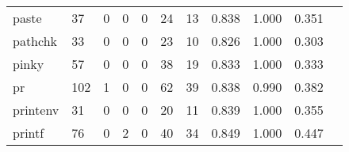 \begin{longtable}{lp{1.20cm}p{1.20cm}p{1.20cm}p{1.20cm}p{1.20cm}p{1.20cm}p{1.20cm}p{1.20cm}p{1.20cm}p{1.20cm}}
paste     &                                    37 &                                                  0 &                                                  0 &                                                  0 &                                                 24 &                                                 13 &                                         0.838 &                                              1.000 &                                              0.351 \\
pathchk   &                                    33 &                                                  0 &                                                  0 &                                                  0 &                                                 23 &                                                 10 &                                         0.826 &                                              1.000 &                                              0.303 \\
pinky     &                                    57 &                                                  0 &                                                  0 &                                                  0 &                                                 38 &                                                 19 &                                         0.833 &                                              1.000 &                                              0.333 \\
pr        &                                   102 &                                                  1 &                                                  0 &                                                  0 &                                                 62 &                                                 39 &                                         0.838 &                                              0.990 &                                              0.382 \\
printenv  &                                    31 &                                                  0 &                                                  0 &                                                  0 &                                                 20 &                                                 11 &                                         0.839 &                                              1.000 &                                              0.355 \\
printf    &                                    76 &                                                  0 &                                                  2 &                                                  0 &                                                 40 &                                                 34 &                                         0.849 &                                              1.000 &                                              0.447 \\

\end{longtable}
